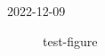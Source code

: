 


2022-12-09


\begin{figure}[ht]
    \centering
    \caption{test-figure}
    \label{fig:test-figure}
\end{figure}


